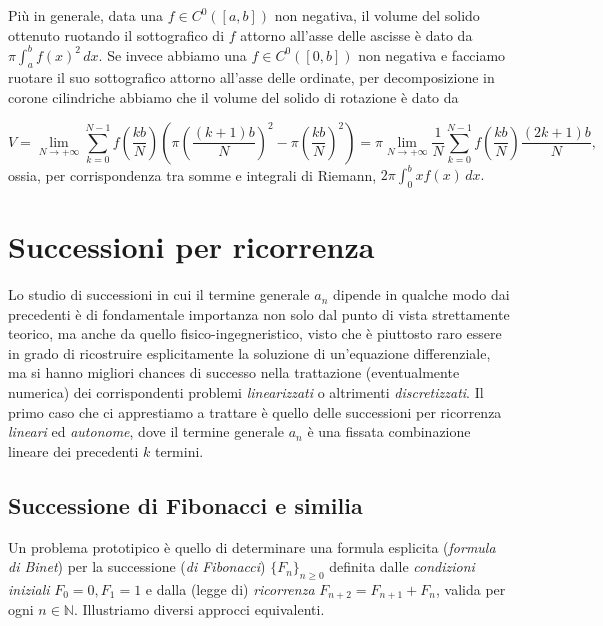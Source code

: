 \documentclass[a4paper,twoside]{article}
\newcommand{\N}{\mathbb{N}}
\theoremstyle{definition}
\numberwithin{theorem}{section}
\begin{document}
Più in generale, data una $f\in C^{0}([a,b])$ non negativa, il volume del solido ottenuto ruotando il sottografico di $f$ attorno all'asse delle ascisse è dato da $\pi\int_{a}^{b}f(x)^2\,dx$. Se invece abbiamo una $f\in C^0([0,b])$ non negativa e facciamo ruotare il suo sottografico attorno all'asse delle ordinate, per decomposizione in corone cilindriche abbiamo che il volume del solido di rotazione è dato da

$$ V=\lim_{N\to +\infty} \sum_{k=0}^{N-1} f\left(\frac{kb}{N}\right)\left(\pi\left(\frac{(k+1)b}{N}\right)^2-\pi\left(\frac{kb}{N}\right)^2\right)=\pi\lim_{N\to +\infty}\frac{1}{N}\sum_{k=0}^{N-1}f\left(\frac{kb}{N}\right)\frac{(2k+1)b}{N}, $$
ossia, per corrispondenza tra somme e integrali di Riemann, $2\pi\int_{0}^{b} x f(x)\,dx.$



\section{Successioni per ricorrenza}
Lo studio di successioni in cui il termine generale $a_n$ dipende in qualche modo dai precedenti è di fondamentale importanza non solo dal punto di vista strettamente teorico, ma anche da quello fisico-ingegneristico, visto che è piuttosto raro essere in grado di ricostruire esplicitamente la soluzione di un'equazione differenziale, ma si hanno migliori chances di successo nella trattazione (eventualmente numerica) dei corrispondenti problemi \emph{linearizzati} o altrimenti \emph{discretizzati}. Il primo caso che ci apprestiamo a trattare è quello delle successioni per ricorrenza \emph{lineari} ed \emph{autonome}, dove il termine generale $a_n$ è una fissata combinazione lineare dei precedenti $k$ termini.

\subsection{Successione di Fibonacci e similia}
Un problema prototipico è quello di determinare una formula esplicita (\emph{formula di Binet}) per la successione (\emph{di Fibonacci}) $\{F_n\}_{n\geq 0}$ definita dalle \emph{condizioni iniziali} $F_0=0, F_1=1$ e dalla (legge di) \emph{ricorrenza} $F_{n+2}=F_{n+1}+F_n$, valida per ogni $n\in\N$. Illustriamo diversi approcci equivalenti.\\
\end{document}
